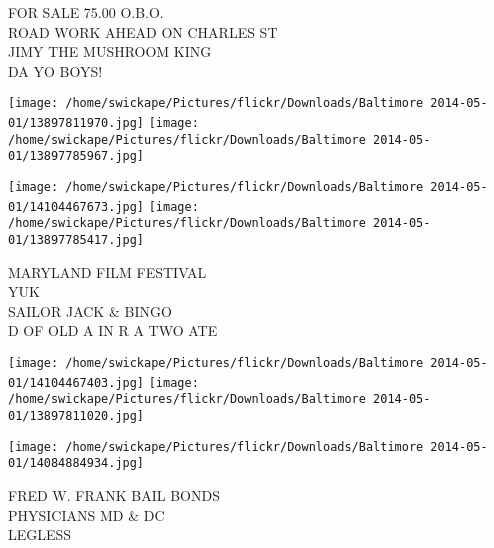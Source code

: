 \documentclass[10pt,letterpaper]{article}
\begin{document}
FOR SALE 75.00 O.B.O.\\
ROAD WORK AHEAD ON CHARLES ST\\
JIMY THE MUSHROOM KING\\
DA YO BOYS!\\
\pagebreak

\texttt{[image: /home/swickape/Pictures/flickr/Downloads/Baltimore 2014-05-01/13897811970.jpg]}
\texttt{[image: /home/swickape/Pictures/flickr/Downloads/Baltimore 2014-05-01/13897785967.jpg]}

\texttt{[image: /home/swickape/Pictures/flickr/Downloads/Baltimore 2014-05-01/14104467673.jpg]}
\texttt{[image: /home/swickape/Pictures/flickr/Downloads/Baltimore 2014-05-01/13897785417.jpg]}

MARYLAND FILM FESTIVAL\\
YUK\\
SAILOR JACK \& BINGO\\
D OF OLD A IN R A TWO ATE\\
\pagebreak

\texttt{[image: /home/swickape/Pictures/flickr/Downloads/Baltimore 2014-05-01/14104467403.jpg]}
\texttt{[image: /home/swickape/Pictures/flickr/Downloads/Baltimore 2014-05-01/13897811020.jpg]}

\texttt{[image: /home/swickape/Pictures/flickr/Downloads/Baltimore 2014-05-01/14084884934.jpg]}

FRED W. FRANK BAIL BONDS\\
PHYSICIANS MD \& DC\\
LEGLESS\\
\pagebreak
\end{document}
